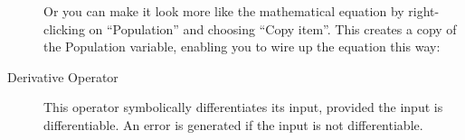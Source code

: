 \begin{description}
Or you can make it look more like the mathematical equation by right-clicking
on ``Population'' and choosing ``Copy item''. This creates a copy
of the Population variable, enabling you to wire up the equation this
way:
\begin{center}
\par\end{center}
\item [{Derivative Operator}]  This operator
symbolically differentiates its input, provided the input is differentiable.
An error is generated if the input is not differentiable.
\end{description}

